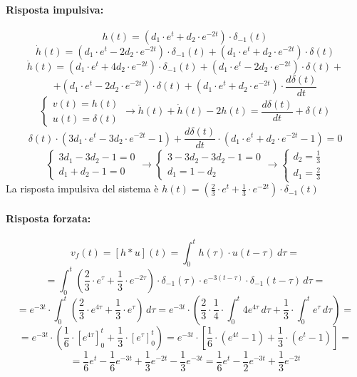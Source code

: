 \documentclass[a4paper,oneside,titlepage]{book}
\begin{document}
\paragraph{Risposta impulsiva:}
\[ h(t) = (d_1 \cdot e^t + d_2 \cdot e^{-2t}) \cdot \delta_{-1}(t) \]
\[
\dot{h}(t) = (d_1 \cdot e^t -2 d_2 \cdot e^{-2t}) \cdot \delta_{-1}(t)
+ (d_1 \cdot e^t + d_2 \cdot e^{-2t}) \cdot \delta(t)
\]
\[ \ddot{h}(t) = (d_1 \cdot e^t +4 d_2 \cdot e^{-2t}) \cdot \delta_{-1}(t)
+ (d_1 \cdot e^t -2 d_2 \cdot e^{-2t}) \cdot \delta(t) + \]
\[ + (d_1 \cdot e^t -2 d_2 \cdot e^{-2t}) \cdot \delta(t)
+ (d_1 \cdot e^t + d_2 \cdot e^{-2t}) \cdot \frac{d \delta(t)}{dt} \]
\[
\begin{cases}
v(t) = h(t) \\
u(t) = \delta(t)
\end{cases}
\longrightarrow
\ddot{h}(t) + \dot{h}(t) -2 h(t) = \frac{d \delta(t)}{dt} + \delta(t)
\]
\[
\delta(t) \cdot (3d_1 \cdot e^t -3 d_2 \cdot e^{-2t} -1) + \frac{d \delta(t)}{dt} \cdot (d_1 \cdot e^t + d_2 \cdot e^{-2t} -1) = 0
\]
\[
\begin{cases}
3d_1 -3d_2 - 1 = 0 \\
d_1 + d_2 - 1 = 0
\end{cases}
\longrightarrow
\begin{cases}
3 - 3d_2 - 3d_2 - 1 = 0 \\
d_1 = 1 - d_2
\end{cases}
\longrightarrow
\begin{cases}
d_2 = \frac{1}{3} \\
d_1 = \frac{2}{3}
\end{cases}
\]
La risposta impulsiva del sistema è $h(t) = \left( \frac{2}{3} \cdot e^t + \frac{1}{3} \cdot e^{-2t} \right) \cdot \delta_{-1}(t)$

\paragraph{Risposta forzata:}
\[ v_f(t) = [h*u](t) = \int_{0}^t h(\tau) \cdot u(t-\tau) \, d\tau = \]
\[
= \int_{0}^t \left( \frac{2}{3} \cdot e^\tau + \frac{1}{3} \cdot e^{-2\tau} \right) \cdot \delta_{-1}(\tau) \cdot e^{-3(t-\tau)} \cdot \delta_{-1}(t-\tau) \, d\tau =
\]
\[
= e^{-3t} \cdot \int_{0}^t \left( \frac{2}{3} \cdot e^{4\tau} + \frac{1}{3} \cdot e^\tau \right) \, d\tau = e^{-3t} \cdot \left( \frac{2}{3} \cdot \frac{1}{4} \cdot \int_{0}^t 4e^{4\tau} \, d\tau + \frac{1}{3} \cdot \int_{0}^t e^\tau \, d\tau \right) =
\]
\[
= e^{-3t} \cdot \left( \frac{1}{6} \cdot \left[ e^{4\tau} \right]_0^t + \frac{1}{3} \cdot \left[ e^\tau \right]_0^t \right) = e^{-3t} \cdot \left[ \frac{1}{6} \cdot (e^{4t} - 1) + \frac{1}{3} \cdot (e^t - 1) \right] =
\]
\[
= \frac{1}{6} e^{t} - \frac{1}{6} e^{-3t} + \frac{1}{3} e^{-2t} - \frac{1}{3} e^{-3t} = \frac{1}{6} e^{t} - \frac{1}{2} e^{-3t} + \frac{1}{3} e^{-2t}
\]
\end{document}
